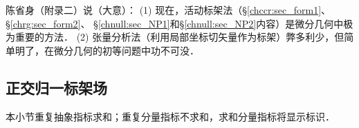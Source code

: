 {\kaishu 
    陈省身（\parencite{cc2001-zh}附录二）说（大意）：
    (1) 现在，活动标架法（\S \ref{chccr:sec_form1}、\S\ref{chrg:sec_form2}、
    \S\ref{chnull:sec_NP1}和\S\ref{chnull:sec_NP2}内容）是微分几何中极为重要的方法．
    (2) 张量分析法（利用局部坐标切矢量作为标架）弊多利少，但简单明了，在微分几何的初等问题中功不可没．
}


%


\subsection{正交归一标架场}\label{chrg:sec_E3-Orthogonal-Normalization}
本小节重复抽象指标求和；重复分量指标不求和，求和分量指标将显示标识．

